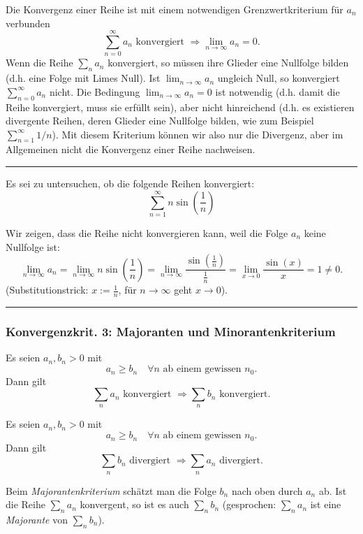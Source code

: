 \documentclass[a4paper,landscape,8pt]{extarticle}
\newcommand{\sep}{\vspace{5pt}\noindent\hrule\vspace{5pt}}
\begin{document}
\begin{multicols*}{4}
Die Konvergenz einer Reihe ist mit einem notwendigen Grenzwertkriterium für
$a_n$ verbunden
\[
\sum_{n=0}^\infty a_n \text{ konvergiert } \Longrightarrow \lim_{n\to\infty} a_n
= 0.
\]
Wenn die Reihe $\sum_n a_n$ konvergiert, so müssen ihre Glieder eine Nullfolge
bilden (d.h. eine Folge mit Limes Null). Ist $\lim_{n\to\infty} a_n$ ungleich
Null, so konvergiert $\sum_{n=0}^{\infty} a_n$ nicht. Die Bedingung
$\lim_{n\to\infty} a_n=0$ ist notwendig (d.h. damit die Reihe konvergiert, muss
sie erfüllt sein), aber nicht hinreichend (d.h. es existieren divergente
Reihen, deren Glieder eine Nullfolge bilden, wie zum Beispiel
$\sum_{n=1}^\infty 1/n$). Mit diesem Kriterium können wir also nur die
Divergenz, aber im Allgemeinen nicht die Konvergenz einer Reihe nachweisen.

\begin{warmup}
\sep

\Bsp Es sei zu untersuchen, ob die folgende Reihen konvergiert:
\[
\sum_{n=1}^\infty n \sin \left(\frac{1}{n}\right)
\]

Wir zeigen, dass die Reihe nicht konvergieren kann, weil die Folge $a_n$ keine
Nullfolge ist:
\[
\lim_{n\to \infty} a_n = \lim_{n\to\infty} n \sin \left(\frac{1}{n}\right)
= \lim_{n\to\infty} \frac{\sin\left(\frac{1}{n}\right)}{\frac{1}{n}}
= \lim_{x\to 0} \frac{\sin (x)}{x} = 1 \neq 0.
\]
(Substitutionstrick: $x:=\frac{1}{n}$, für $n\to \infty$ geht
$x\to 0$).

\end{warmup}

\sep

\subsubsection{Konvergenzkrit. 3: Majoranten und Minorantenkriterium}

\Satz[Majorantenkrit.] Es seien $a_n,b_n > 0$ mit
\[
a_n\geq b_n \quad \forall n \text{ ab einem gewissen } n_0.
\]
Dann gilt
\[
\sum_n a_n \text{ konvergiert } \Longrightarrow \sum_n b_n \text{ konvergiert}.
\]

\Satz[Minorantenkrit.] Es seien $a_n, b_n > 0$ mit
\[
a_n\geq b_n \quad \forall n \text{ ab einem gewissen } n_0.
\]
Dann gilt
\[
\sum_n b_n \text{ divergiert } \Longrightarrow \sum_n a_n \text{ divergiert}.
\]

Beim \emph{Majorantenkriterium} schätzt man die Folge $b_n$ nach oben durch
$a_n$ ab. Ist die Reihe $\sum_n a_n$ konvergent, so ist es auch $\sum_n b_n$
(gesprochen: $\sum_n a_n$ ist eine \emph{Majorante} von $\sum_n b_n$).


\end{multicols*}
\end{document}
